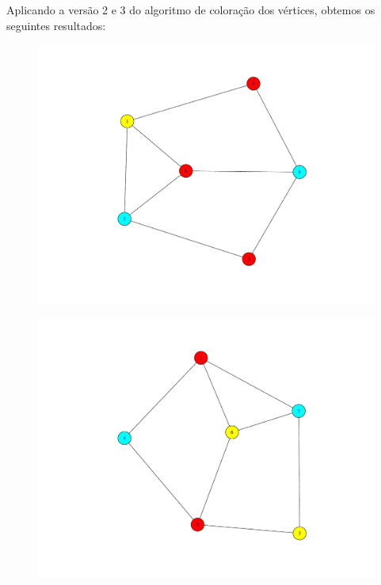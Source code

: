 \documentclass[a4paper,12pt]{report}
\begin{document}
Aplicando a versão 2 e 3 do algoritmo de coloração dos vértices, obtemos os seguintes resultados:

\begin{figure}[H]
    \centering
    \begin{minipage}{.5\textwidth}
      \centering
      \includegraphics[scale=0.3]{img/v2I.pdf}
      \label{fig:v2I}
    \end{minipage}%
    \begin{minipage}{.5\textwidth}
      \centering
      \includegraphics[scale=0.3]{img/v3I.pdf}
      \label{fig:v3I}
    \end{minipage}
\end{figure}
\end{document}
